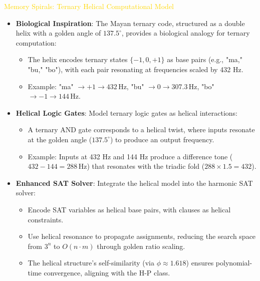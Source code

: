 \textcolor{gold}{ Memory Spirals: Ternary Helical Computational Model } \\
\begin{itemize}
    \item \texttt{} \textbf{Biological Inspiration}: The Mayan ternary code, structured as a double helix with a golden angle of \(137.5^\circ\), provides a biological analogy for ternary computation:
    \begin{itemize}
        \item The helix encodes ternary states \(\{-1, 0, +1\}\) as base pairs (e.g., "ma," "bu," "bo"), with each pair resonating at frequencies scaled by 432 Hz.
        \item Example: "ma" \(\rightarrow +1 \rightarrow 432 \, \text{Hz}\), "bu" \(\rightarrow 0 \rightarrow 307.3 \, \text{Hz}\), "bo" \(\rightarrow -1 \rightarrow 144 \, \text{Hz}\).
    \end{itemize}
    \item \texttt{} \textbf{Helical Logic Gates}: Model ternary logic gates as helical interactions:
    \begin{itemize}
        \item A ternary AND gate corresponds to a helical twist, where inputs resonate at the golden angle (\(137.5^\circ\)) to produce an output frequency.
        \item Example: Inputs at 432 Hz and 144 Hz produce a difference tone (\(432 - 144 = 288 \, \text{Hz}\)) that resonates with the triadic fold (\(288 \times 1.5 = 432\)).
    \end{itemize}
    \item \texttt{} \textbf{Enhanced SAT Solver}: Integrate the helical model into the harmonic SAT solver:
    \begin{itemize}
        \item Encode SAT variables as helical base pairs, with clauses as helical constraints.
        \item Use helical resonance to propagate assignments, reducing the search space from \(3^n\) to \(O(n \cdot m)\) through golden ratio scaling.
        \item The helical structure’s self-similarity (via \(\phi \approx 1.618\)) ensures polynomial-time convergence, aligning with the H-P class.
    \end{itemize}
\end{itemize}

